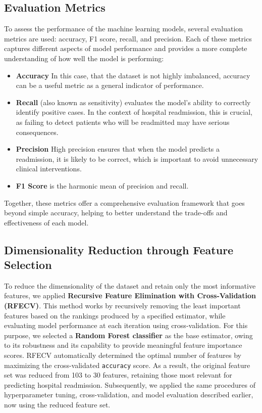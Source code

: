 \subsection{Evaluation Metrics}
To assess the performance of the machine learning models, several evaluation metrics are used: accuracy, F1 score, recall, and precision. Each of these metrics captures different aspects of model performance and provides a more complete understanding of how well the model is performing:
\begin{itemize}
    \item \textbf{Accuracy} In this case, that the dataset is not highly imbalanced, accuracy can be a useful metric as a general indicator of performance. 
    \item \textbf{Recall} (also known as sensitivity) evaluates the model’s ability to correctly identify positive cases. In the context of hospital readmission, this is crucial, as failing to detect patients who will be readmitted may have serious consequences.
    \item \textbf{Precision} High precision ensures that when the model predicts a readmission, it is likely to be correct, which is important to avoid unnecessary clinical interventions.
    \item \textbf{F1 Score} is the harmonic mean of precision and recall.
\end{itemize}
\noindent
Together, these metrics offer a comprehensive evaluation framework that goes beyond simple accuracy, helping to better understand the trade-offs and effectiveness of each model.

\subsection{Dimensionality Reduction through Feature Selection}

To reduce the dimensionality of the dataset and retain only the most informative features, we applied \textbf{Recursive Feature Elimination with Cross-Validation (RFECV)}. This method works by recursively removing the least important features based on the rankings produced by a specified estimator, while evaluating model performance at each iteration using cross-validation.
For this purpose, we selected a \textbf{Random Forest classifier} as the base estimator, owing to its robustness and its capability to provide meaningful feature importance scores. RFECV automatically determined the optimal number of features by maximizing the cross-validated \texttt{accuracy} score.
As a result, the original feature set was reduced from 103 to 30 features, retaining those most relevant for predicting hospital readmission. Subsequently, we applied the same procedures of hyperparameter tuning, cross-validation, and model evaluation described earlier, now using the reduced feature set.

